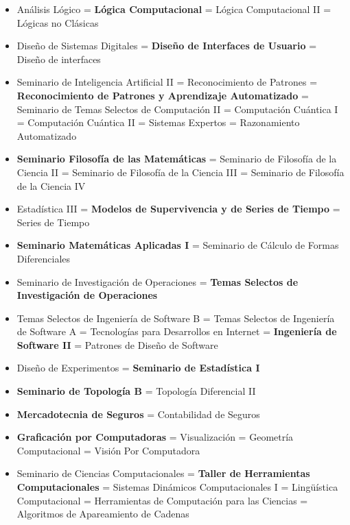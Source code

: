 \begin{itemize}
\item Análisis Lógico = \textbf{Lógica Computacional} = Lógica Computacional II = Lógicas no Clásicas

\item Diseño de Sistemas Digitales = \textbf{Diseño de Interfaces de Usuario} = Diseño de interfaces

\item Seminario de Inteligencia Artificial II = Reconocimiento de Patrones = \textbf{Reconocimiento de Patrones y Aprendizaje Automatizado} = Seminario de Temas Selectos de Computación II = Computación Cuántica I = Computación Cuántica II = Sistemas Expertos = Razonamiento Automatizado

\item \textbf{Seminario Filosofía de las Matemáticas} = Seminario de Filosofía de la Ciencia II = Seminario de Filosofía de la Ciencia III = Seminario de Filosofía de la Ciencia IV

\item Estadística III = \textbf{Modelos de Supervivencia y de Series de Tiempo} =  Series de Tiempo

\item \textbf{Seminario Matemáticas Aplicadas I} = Seminario de Cálculo de Formas Diferenciales

\item Seminario de Investigación de Operaciones = \textbf{Temas Selectos de Investigación de Operaciones}

\item Temas Selectos de Ingeniería de Software B = Temas Selectos de Ingeniería de Software A = Tecnologías para Desarrollos en Internet = \textbf{Ingeniería de Software II} = Patrones de Diseño de Software

\item Diseño de Experimentos = \textbf{Seminario de Estadística I}

\item \textbf{Seminario de Topología B} = Topología Diferencial II

\item \textbf{Mercadotecnia de Seguros} = Contabilidad de Seguros

\item \textbf{Graficación por Computadoras} = Visualización = Geometría Computacional = Visión Por Computadora

\item Seminario de Ciencias Computacionales = \textbf{Taller de Herramientas Computacionales} = Sistemas Dinámicos Computacionales I = Lingüística Computacional = Herramientas de Computación para las Ciencias = Algoritmos de Apareamiento de Cadenas


\end{itemize}
